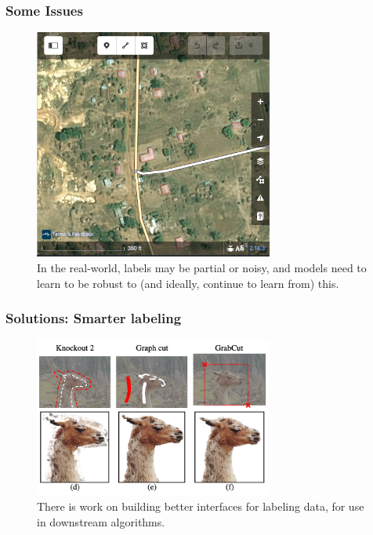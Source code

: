 \documentclass[10pt,mathserif]{beamer}
\begin{document}
\begin{frame}
  \frametitle{Some Issues}
\begin{figure}[ht]
  \centering
  \includegraphics[width=0.7\textwidth]{figures/labeling}
  \caption{In the real-world, labels may be partial or noisy, and models need to
    learn to be robust to (and ideally, continue to learn from) this.}
\end{figure}
\end{frame}

\begin{frame}
  \frametitle{Solutions: Smarter labeling}
\begin{figure}[ht]
  \centering
  \includegraphics[width=0.7\textwidth]{figures/grabcut}
  \caption{There is work on building better interfaces for labeling data, for
    use in downstream algorithms. \label{fig:label} }
\end{figure}
\end{frame}
\end{document}
